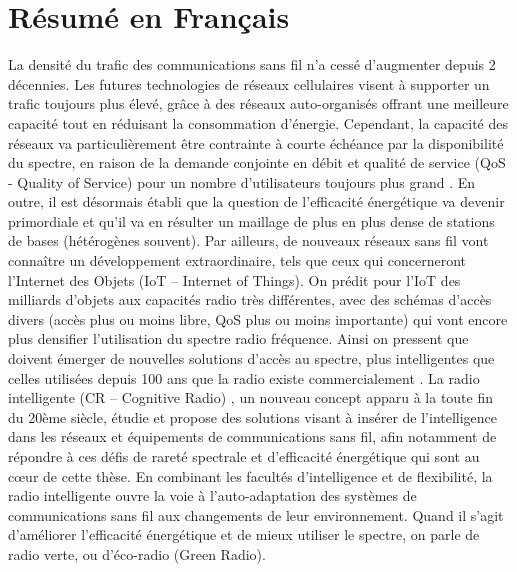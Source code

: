 
\chapter{Résumé en Français} %



La densité du trafic des communications sans fil n’a cessé d’augmenter depuis 2 décennies. Les futures technologies de réseaux cellulaires visent à supporter un trafic toujours plus élevé, grâce à des réseaux auto-organisés offrant une meilleure capacité tout en réduisant la consommation d’énergie. Cependant, la capacité des réseaux va particulièrement être contrainte à courte échéance par la disponibilité du spectre, en raison de la demande conjointe en débit et qualité de service (QoS - Quality of Service) pour un nombre d’utilisateurs toujours plus grand \cite{Cisco_2013}. En outre, il est désormais établi que la question de l’efficacité énergétique va devenir primordiale et qu’il va en résulter un maillage de plus en plus dense de stations de bases (hétérogènes souvent). Par ailleurs, de nouveaux réseaux sans fil vont connaître un développement extraordinaire, tels que ceux qui concerneront l’Internet des Objets (IoT – Internet of Things). On prédit pour l’IoT des milliards d’objets aux capacités radio très différentes, avec des schémas d’accès divers (accès plus ou moins libre, QoS plus ou moins importante) qui vont encore plus densifier l’utilisation du spectre radio fréquence. Ainsi on pressent que doivent émerger de nouvelles solutions d’accès au spectre, plus intelligentes que celles utilisées depuis 100 ans que la radio existe commercialement \cite{Fed_2002}. La radio intelligente (CR – Cognitive Radio) \cite{Palicot_2013}, un nouveau concept apparu à la toute fin du 20ème siècle, étudie et propose des solutions visant à insérer de l’intelligence dans les réseaux et équipements de communications sans fil, afin notamment de répondre à ces défis de rareté spectrale et d’efficacité énergétique qui sont au cœur de cette thèse. En combinant les facultés d’intelligence et de flexibilité, la radio intelligente ouvre la voie à l’auto-adaptation des systèmes de communications sans fil aux changements de leur environnement. Quand il s’agit d’améliorer l’efficacité énergétique et de mieux utiliser le spectre, on parle de radio verte, ou d’éco-radio (Green Radio). 

